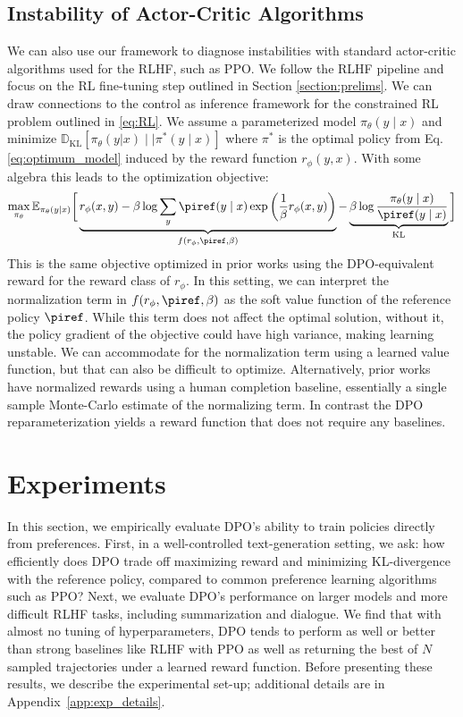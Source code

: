 \subsection{Instability of Actor-Critic Algorithms}
We can also use our framework to diagnose instabilities with standard actor-critic algorithms used for the RLHF, such as PPO. We follow the RLHF pipeline and focus on the RL fine-tuning step outlined in Section \ref{section:prelims}. We can draw connections to the control as inference framework \cite{levine2018reinforcement} for the constrained RL problem outlined in \ref{eq:RL}. We assume a parameterized model $\pi_{\theta}(y\mid x)$ and minimize $\mathbb{D}_{\text{KL}}[\pi_{\theta}(y|x) \mid \mid \pi^*(y\mid x)]$ where $\pi^*$ is the optimal policy from Eq. \ref{eq:optimum_model} induced by the reward function $r_{\phi}(y, x)$. With some algebra this leads to the optimization objective:
\begin{equation}\label{eq:AC}
    \max_{\pi_{\theta}}\mathbb{E}_{\pi_{\theta}(y\mid x)}\bigg[\underbrace{r_{\phi}(x, y) -\beta\log\sum_{y}\piref(y\mid x)\exp\left(\frac{1}{\beta}r_{\phi}(x, y)\right)}_{f(r_{\phi}, \piref, \beta)} - \underbrace{\beta\log\frac{\pi_{\theta}(y\mid x)}{\piref(y\mid x)}}_{\text{KL}}\bigg]
\end{equation}
This is the same objective optimized in prior works 
\citep{ziegler2020finetuning, stiennon2022learning, bai2022training, ouyang2022training} using the DPO-equivalent reward for the reward class of $r_{\phi}$. In this setting, we can interpret the normalization term in $f(r_{\phi}, \piref, \beta)$ as the soft value function of the reference policy $\piref$. While this term does not affect the optimal solution, without it, the policy gradient of the objective could have high variance, making learning unstable. We can accommodate for the normalization term using a learned value function, but that can also be difficult to optimize. Alternatively, prior works have normalized rewards using a human completion baseline, essentially a single sample Monte-Carlo estimate of the normalizing term. In contrast the DPO reparameterization yields a reward function that does not require any baselines. 

\section{Experiments}
In this section, we empirically evaluate DPO's ability to train policies directly from preferences. First, in a well-controlled text-generation setting, we ask: how efficiently does DPO trade off maximizing reward and minimizing KL-divergence with the reference policy, compared to common preference learning algorithms such as PPO? Next, we evaluate DPO's performance on larger models and more difficult RLHF tasks, including summarization and dialogue. We find that with almost no tuning of hyperparameters, DPO tends to perform as well or better than strong baselines like RLHF with PPO as well as returning the best of $N$ sampled trajectories under a learned reward function. Before presenting these results, we describe the experimental set-up; additional details are in Appendix~\ref{app:exp_details}.

